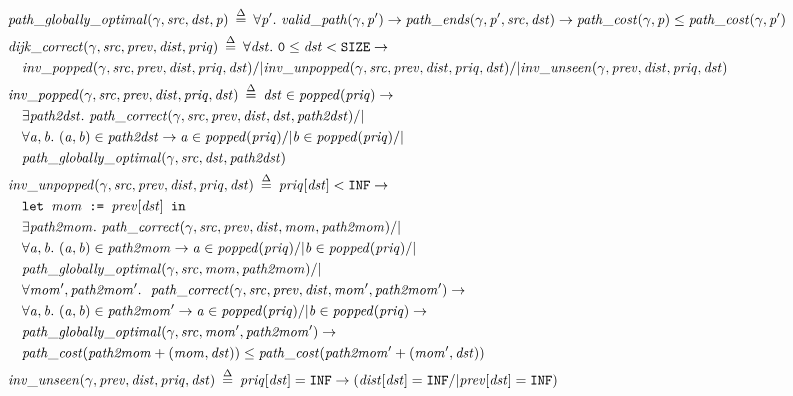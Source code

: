 \begin{figure}
\begin{equation*}
\begin{split}
\vspace{1em}
&\!\!\!\!\!\!\m{path\_globally\_optimal}(\gamma, \m{src}, \m{dst}, \m{p}) \; \defeq \; 
\forall \m{p'}.~\m{valid\_path}(\gamma, \m{p'}) -> \m{path\_ends}(\gamma, \m{p'}, \m{src}, \m{dst}) -> \m{path\_cost}(\gamma, \m{p}) \le \m{path\_cost}(\gamma, \m{p'}) \\
\vspace{2em}
&\!\!\!\!\!\!\m{dijk\_correct}(\gamma, \m{src}, \m{prev}, \m{dist}, \m{priq}) \; \defeq \; \forall \m{dst}.~\texttt{0} \le \m{dst} < \texttt{SIZE} -> \\
&\m{inv\_popped}(\gamma, \m{src}, \m{prev}, \m{dist}, \m{priq}, \m{dst}) /|
\m{inv\_unpopped}(\gamma, \m{src}, \m{prev}, \m{dist}, \m{priq}, \m{dst}) /| 
\m{inv\_unseen}(\gamma, \m{prev}, \m{dist}, \m{priq}, \m{dst}) \\
\vspace{1em}
&\!\!\!\!\!\!\m{inv\_popped}(\gamma, \m{src}, \m{prev}, \m{dist}, \m{priq}, \m{dst}) \; \defeq \; \m{dst} \in \m{popped}(\m{priq}) -> \\
&\exists \m{path2dst}.~\m{path\_correct}(\gamma, \m{src}, \m{prev}, \m{dist}, \m{dst}, \m{path2dst}) /| \null \\
&\forall \m{a, b}.~\m{(a, b)} \in \m{path2dst} -> \m{a} \in \m{popped}(\m{priq}) /| \m{b} \in \m{popped}(\m{priq}) /| \null \\
&\m{path\_globally\_optimal}(\gamma, \m{src}, \m{dst}, \m{path2dst}) \\
\vspace{1em}
&\!\!\!\!\!\!\m{inv\_unpopped}(\gamma, \m{src}, \m{prev}, \m{dist}, \m{priq}, \m{dst}) \; \defeq \; \m{priq}[\m{dst}] < \texttt{INF} -> \\
&\texttt{let } \m{mom} \texttt{ := } \m{prev}[\m{dst}] \texttt{ in } \\
&\exists \m{path2mom}.~\m{path\_correct}(\gamma, \m{src}, \m{prev}, \m{dist}, \m{mom}, \m{path2mom}) /| \null \\
&\forall \m{a, b}.~\m{(a, b)} \in \m{path2mom} -> \m{a} \in \m{popped}(\m{priq}) /| \m{b} \in \m{popped}(\m{priq}) /| \null \\
&\m{path\_globally\_optimal}(\gamma, \m{src}, \m{mom}, \m{path2mom}) /| \null \\
&\forall \m{mom', path2mom'}.~~\m{path\_correct}(\gamma, \m{src}, \m{prev}, \m{dist}, \m{mom'}, \m{path2mom'}) -> \\
&\forall \m{a, b}.~\m{(a, b)} \in \m{path2mom'} -> \m{a} \in \m{popped}(\m{priq}) /| \m{b} \in \m{popped}(\m{priq}) -> \\
&\m{path\_globally\_optimal}(\gamma, \m{src}, \m{mom'}, \m{path2mom'}) -> \\
&\m{path\_cost}(\m{path2mom} + \m{(mom, dst)}) \le \m{path\_cost}(\m{path2mom'} + \m{(mom', dst)}) \\
\vspace{1em}
&\!\!\!\!\!\!\m{inv\_unseen}(\gamma, \m{prev}, \m{dist}, \m{priq}, \m{dst}) \; \defeq \; \m{priq}[\m{dst}] = \texttt{INF} ->
(\m{dist}[\m{dst}] = \texttt{INF} /| \m{prev}[\m{dst}] = \texttt{INF})
\end{split}  
\end{equation*}
\end{figure}

